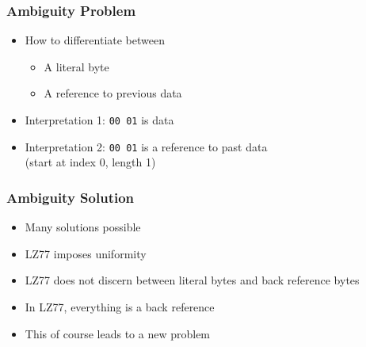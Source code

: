 \begin{frame}
  \frametitle{Ambiguity Problem}
  \begin{center}
  \end{center}

  \begin{itemize}
    \item How to differentiate between
          \begin{itemize}
            \item A literal byte
            \item A reference to previous data
          \end{itemize}
    \item Interpretation 1: {\tt 00 01} is data
    \item Interpretation 2: {\tt 00 01} is a reference to past data \\ (start at index 0, length 1)
  \end{itemize}
\end{frame}

\begin{frame}
  \frametitle{Ambiguity Solution}
  \begin{itemize}
    \item Many solutions possible
    \item LZ77 imposes uniformity
    \item LZ77 does not discern between literal bytes and back reference bytes
    \item In LZ77, everything is a back reference
    \item This of course leads to a new problem
  \end{itemize}
\end{frame}

